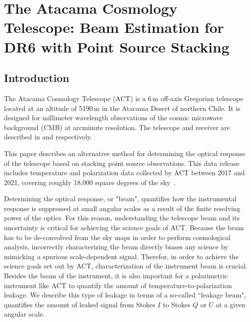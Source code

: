 \chapter{The Atacama Cosmology Telescope: Beam Estimation for DR6 with Point Source Stacking}
\label{ch:actbeams}

\section{\label{sec:act_intro}Introduction}
\setcounter{footnote}{0}

The Atacama Cosmology Telescope (ACT) is a 6\,m off-axis Gregorian telescope located at an altitude of 5190\,m in the Atacama Desert of northern Chile. It is designed for millimeter wavelength observations of the cosmic microwave background (CMB) at arcminute resolution.  The telescope and receiver are described in \cite{fowler_2007} and \cite{thornton_2016} respectively. 

This paper describes an alternative method for determining the optical response of the telescope based on stacking point source observations.  This data release includes temperature and polarization data collected by ACT between 2017 and 2021, covering roughly 18,000 square degrees of the sky~\cite{thornton_2016}.

Determining the optical response, or "beam", quantifies how the instrumental response is suppressed at small angular scales as a result of the finite resolving power of the optics.  For this reason, understanding the telescope beam and its uncertainty is critical for achieving the science goals of ACT.  Because the beam has to be de-convolved from the sky maps in order to perform cosmological analysis, incorrectly characterizing the beam directly biases any science by mimicking a spurious scale-dependent signal.  Therefor, in order to achieve the science goals set out by ACT, characterization of the instrument beam is crucial.  Besides the beam of the instrument, it is also important for a polarimetric instrument like ACT to quantify the amount of temperature-to-polarization leakage. We describe this type of leakage in terms of a so-called ``leakage beam", quantifies the amount of leaked signal from Stokes $I$ to Stokes $Q$ or $U$ at a given angular scale.

